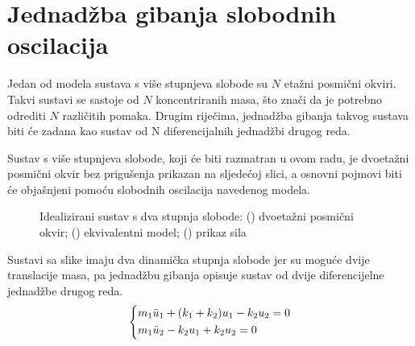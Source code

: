 \section{Jednadžba gibanja slobodnih oscilacija}\label{slobodne_oscilacije}
Jedan od modela sustava s više stupnjeva slobode su $N$ etažni posmični
okviri. Takvi sustavi se sastoje od $N$ koncentriranih masa, što znači da je potrebno 
odrediti $N$ različitih pomaka. Drugim riječima, jednadžba gibanja takvog sustava biti će
zadana kao sustav od N diferencijalnih jednadžbi drugog reda.
\par

Sustav s više stupnjeva slobode, koji će biti razmatran u ovom radu, je dvoetažni
posmični okvir bez prigušenja prikazan na sljedećoj slici, a osnovni pojmovi biti će 
objašnjeni pomoću slobodnih oscilacija navedenog modela.
\begin{figure}[H]
    \begin{subfigure}[b]{0.5\textwidth}
        \centering
        
        \caption{}
        \label{fig:nepriguseni_sustav_okvir-2dof}
    \end{subfigure}
    \hfill
    \begin{subfigure}[b]{0.5\textwidth}
        \centering
        
        \caption{}
        \label{fig:nepriguseni_ekvivalentni_sustav-2dof}
    \end{subfigure}
    \vfill
    \vspace{0.5cm}
    \begin{subfigure}[b]{1\textwidth}
        \centering
        
        \caption{}
        \label{fig:sile_nepriguseni_ekvivalentni_sustav-2dof}
    \end{subfigure}
    \caption{Idealizirani sustav s dva stupnja slobode: 
        () dvoetažni posmični okvir;
        () ekvivalentni model;
        () prikaz sila}
    \label{fig:nepriguseni_sustav-2dof}
\end{figure}

Sustavi sa slike imaju dva dinamička stupnja slobode jer su moguće dvije translacije
masa, pa jednadžbu gibanja opisuje sustav od dvije diferencijelne
jednadžbe drugog reda.
\begin{equation}\label{eq:sustav_diferencijalnih}
    \begin{dcases}
        m_1\ddot{u}_1 + (k_1+k_2)u_1 -k_2u_2 = 0\\
        m_1\ddot{u}_2 - k_2u_1 + k_2 u_2 = 0
    \end{dcases}
\end{equation}

